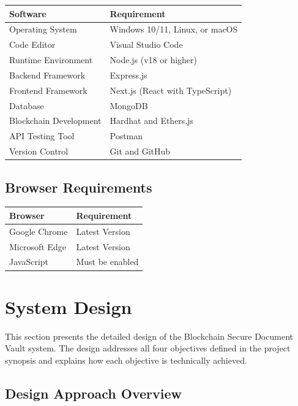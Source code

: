 \documentclass[12pt]{article}
\begin{document}
\begin{center}
\begin{tabular}{|l|p{10cm}|}
\hline
\textbf{Software} & \textbf{Requirement} \\
\hline
Operating System & Windows 10/11, Linux, or macOS \\
\hline
Code Editor & Visual Studio Code \\
\hline
Runtime Environment & Node.js (v18 or higher) \\
\hline
Backend Framework & Express.js \\
\hline
Frontend Framework & Next.js (React with TypeScript) \\
\hline
Database & MongoDB \\
\hline
Blockchain Development & Hardhat and Ethers.js \\
\hline
API Testing Tool & Postman \\
\hline
Version Control & Git and GitHub \\
\hline
\end{tabular}
\end{center}

\subsection{Browser Requirements}

\begin{center}
\begin{tabular}{|l|p{10cm}|}
\hline
\textbf{Browser} & \textbf{Requirement} \\
\hline
Google Chrome & Latest Version \\
\hline
Microsoft Edge & Latest Version \\
\hline
JavaScript & Must be enabled \\
\hline
\end{tabular}
\end{center}

\newpage
\section{System Design}

This section presents the detailed design of the Blockchain Secure Document Vault system. The design addresses all four objectives defined in the project synopsis and explains how each objective is technically achieved.

\subsection{Design Approach Overview}
\end{document}

